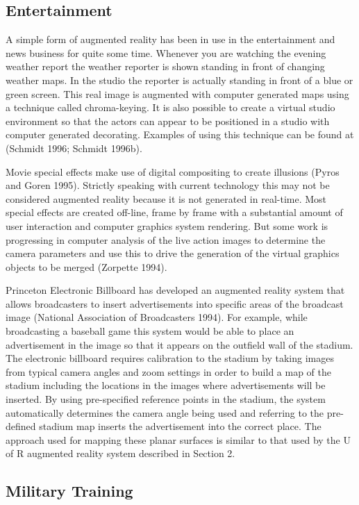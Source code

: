 \subsection{Entertainment}

A simple form of augmented reality has been in use in the entertainment and news business for quite some time. Whenever you are watching the evening weather report the weather reporter is shown standing in front of changing weather maps. In the studio the reporter is actually standing in front of a blue or green screen. This real image is augmented with computer generated maps using a technique called chroma-keying. It is also possible to create a virtual studio environment so that the actors can appear to be positioned in a studio with computer generated decorating. Examples of using this technique can be found at (Schmidt 1996; Schmidt 1996b).

Movie special effects make use of digital compositing to create illusions (Pyros and Goren 1995). Strictly speaking with current technology this may not be considered augmented reality because it is not generated in real-time. Most special effects are created off-line, frame by frame with a substantial amount of user interaction and computer graphics system rendering. But some work is progressing in computer analysis of the live action images to determine the camera parameters and use this to drive the generation of the virtual graphics objects to be merged (Zorpette 1994).

Princeton Electronic Billboard has developed an augmented reality system that allows broadcasters to insert advertisements into specific areas of the broadcast image (National Association of Broadcasters 1994). For example, while broadcasting a baseball game this system would be able to place an advertisement in the image so that it appears on the outfield wall of the stadium. The electronic billboard requires calibration to the stadium by taking images from typical camera angles and zoom settings in order to build a map of the stadium including the locations in the images where advertisements will be inserted. By using pre-specified reference points in the stadium, the system automatically determines the camera angle being used and referring to the pre-defined stadium map inserts the advertisement into the correct place. The approach used for mapping these planar surfaces is similar to that used by the U of R augmented reality system described in Section 2.

\subsection{Military Training}

